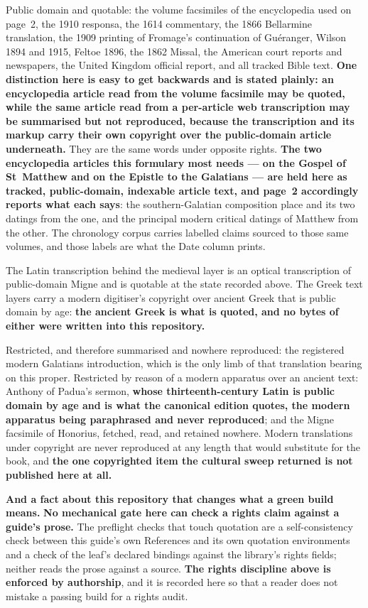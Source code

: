 Public domain and quotable: the volume facsimiles of the encyclopedia used on
page~2, the 1910 responsa, the 1614 commentary, the 1866 Bellarmine
translation, the 1909 printing of Fromage's continuation of Guéranger, Wilson
1894 and 1915, Feltoe 1896, the 1862
Missal, the American court reports and newspapers, the United Kingdom official
report, and all tracked Bible text. \textbf{One distinction here is easy to get
backwards and is stated plainly: an encyclopedia article read from the volume
facsimile may be quoted, while the same article read from a per-article web
transcription may be summarised but not reproduced, because the transcription
and its markup carry their own copyright over the public-domain article
underneath.} They are the same words under opposite rights. \textbf{The two
encyclopedia articles this formulary most needs --- on the Gospel of St~Matthew
and on the Epistle to the Galatians --- are held here as tracked, public-domain,
indexable article text, and page~2 accordingly reports what each says}: the
southern-Galatian composition place and its two datings from the one, and the
principal modern critical datings of Matthew from the other. The chronology
corpus carries labelled claims sourced to those same volumes, and those labels
are what the Date column prints.

The Latin transcription behind the medieval layer is an optical transcription of
public-domain Migne and is quotable at the state recorded above. The Greek text
layers carry a modern digitiser's copyright over ancient Greek that is public
domain by age: \textbf{the ancient Greek is what is quoted, and no bytes of
either were written into this repository.}

Restricted, and therefore summarised and nowhere reproduced: the registered
modern Galatians introduction, which is the only limb of that translation
bearing on this proper. Restricted by reason of a modern apparatus over an
ancient text: Anthony of Padua's sermon, \textbf{whose thirteenth-century Latin
is public domain by age and is what the canonical edition quotes, the modern
apparatus being paraphrased and never reproduced}; and the Migne facsimile of Honorius, fetched,
read, and retained nowhere. Modern translations under copyright are never
reproduced at any length that would substitute for the book, and \textbf{the one
copyrighted item the cultural sweep returned is not published here at all.}

\textbf{And a fact about this repository that changes what a green build
means.} \textbf{No mechanical gate here can check a rights claim against a
guide's prose.} The preflight checks that touch quotation are a self-consistency
check between this guide's own References and its own quotation environments and
a check of the leaf's declared bindings against the library's rights fields;
neither reads the prose against a source. \textbf{The rights discipline above is
enforced by authorship}, and it is recorded here so that a reader does not
mistake a passing build for a rights audit.

